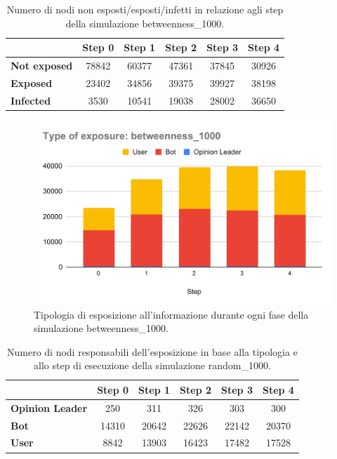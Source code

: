             
            \begin{table}[H]
                \centering
                \begin{tabular}{l|c|c|c|c|c}
                            & Step 0 & Step 1 & Step 2 & Step 3 & Step 4 \\ \hline
                \textbf{Not exposed} & 78842  & 60377  & 47361  & 37845  & 30926  \\ \hline
                \textbf{Exposed}     & 23402  & 34856  & 39375  & 39927  & 38198  \\ \hline
                \textbf{Infected}    & 3530   & 10541  & 19038  & 28002  & 36650  \\
                \end{tabular}
                \caption{Numero di nodi non esposti/esposti/infetti in relazione agli step della simulazione betweenness\_1000.}
            \end{table}

            \begin{figure}[H]
                \centering
                \includegraphics[width=.7\textwidth]{resources/charts/Type of exposure_ betweenness_1000.pdf}
            \caption{Tipologia di esposizione all'informazione durante ogni fase della simulazione betweenness\_1000.}
            \end{figure}
            
            \begin{table}[H]
                \centering
                \begin{tabular}{l|c|c|c|c|c}
                               & Step 0 & Step 1 & Step 2 & Step 3 & Step 4 \\ \hline
                \textbf{Opinion Leader} & 250    & 311    & 326    & 303    & 300    \\ \hline
                \textbf{Bot}            & 14310  & 20642  & 22626  & 22142  & 20370  \\ \hline
                \textbf{User}           & 8842   & 13903  & 16423  & 17482  & 17528  \\
                \end{tabular}
                \caption{Numero di nodi responsabili dell'esposizione in base alla tipologia e allo step di esecuzione della simulazione random\_1000.}
            \end{table}

